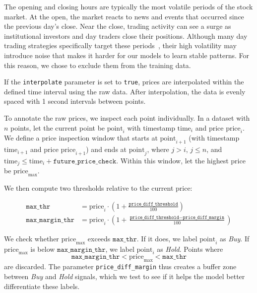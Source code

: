\documentclass[a4paper,oneside,onecolumn,12pt]{book}
\begin{document}
		The opening and closing hours are typically the most volatile periods of the stock market. At the open, the market reacts to news and events that occurred since the previous day's close. Near the close, trading activity can see a surge as institutional investors and day traders close their positions. Although many day trading strategies specifically target these periods~\cite{BTDWMTS}, their high volatility may introduce noise that makes it harder for our models to learn stable patterns. For this reason, we chose to exclude them from the training data.

		If the \texttt{interpolate} parameter is set to \texttt{true}, prices are interpolated within the defined time interval using the raw data. After interpolation, the data is evenly spaced with 1 second intervals between points.

		To annotate the raw prices, we inspect each point individually. In a dataset with $n$ points, let the current point be $\text{point}_i$ with timestamp $\text{time}_i$ and price $\text{price}_i$. We define a price inspection window that starts at $\text{point}_{i+1}$ (with timestamp $\text{time}_{i+1}$ and price $\text{price}_{i+1}$) and ends at $\text{point}_j$, where $j > i$, $j \leq n$, and $\text{time}_j \leq \text{time}_i + \texttt{future\_price\_check}$. Within this window, let the highest price be $\text{price}_{\text{max}}$.

		We then compute two thresholds relative to the current price:

		\begin{align*}
		\texttt{max\_thr} &= \text{price}_i \cdot \left(1 + \frac{\texttt{price\_diff\_threshold}}{100}\right) \\
		\texttt{max\_margin\_thr} &= \text{price}_i \cdot \left(1 + \frac{\texttt{price\_diff\_threshold} - \texttt{price\_diff\_margin}}{100}\right)
		\end{align*}

		We check whether $\text{price}_{\text{max}}$ exceeds $\texttt{max\_thr}$. If it does, we label $\text{point}_i$ as \textit{Buy}. If $\text{price}_{\text{max}}$ is below $\texttt{max\_margin\_thr}$, we label $\text{point}_i$ as \textit{Hold}. Points where
		\[
		\texttt{max\_margin\_thr} < \text{price}_{\text{max}} < \texttt{max\_thr}
		\]
		are discarded. The parameter \texttt{price\_diff\_margin} thus creates a buffer zone between \textit{Buy} and \textit{Hold} signals, which we test to see if it helps the model better differentiate these labels.
		
\end{document}
